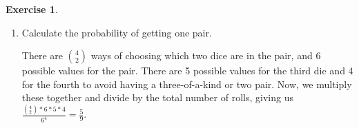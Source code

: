 \documentclass[12pt]{amsart}
\theoremstyle{definition}
\newtheorem{exercise}{Exercise}
\numberwithin{equation}{section}
\theoremstyle{plain}
\begin{document}
\begin{exercise}
\begin{enumerate}[label=\Alph*.]
\begin{answer}
We can choose 6 values for the first dice, 5 values for the next one, 4 values for the third one, and 3 values for the last one. We can now just multiply these together and divide by $6^4$. This simplifies to $\frac{5}{18}$.
\end{answer}
\item Calculate the probability of getting one pair.
\begin{answer}
There are $\binom{4}{2}$ ways of choosing which two dice are in the pair, and 6 possible values for the pair. There are 5 possible values for the third die and 4 for the fourth to avoid having a three-of-a-kind or two pair. Now, we multiply these together and divide by the total number of rolls, giving us $\frac{\binom{4}{2}*6*5*4}{6^4}=\frac{5}{9}$.
\end{answer}
\end{enumerate}
\end{exercise}
 
\end{document}
